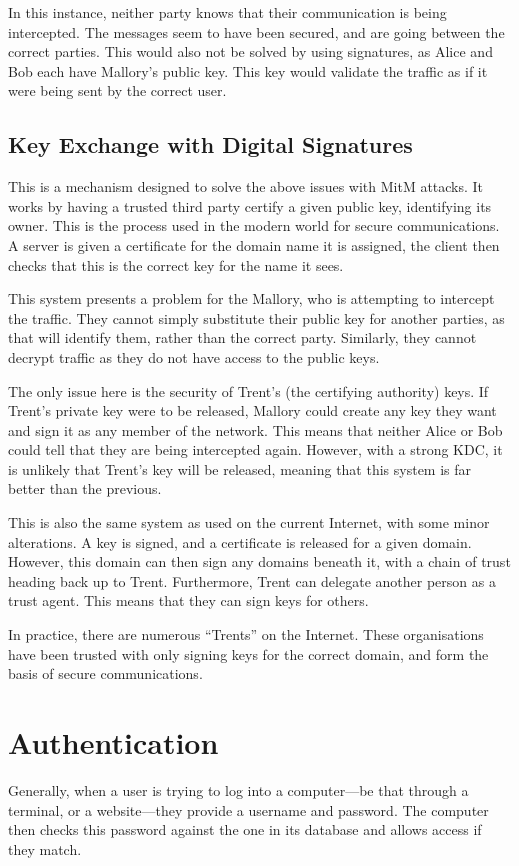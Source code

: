			In this instance, neither party knows that their communication is being intercepted.
			The messages seem to have been secured, and are going between the correct parties.
			This would also not be solved by using signatures, as Alice and Bob each have Mallory's public key.
			This key would validate the traffic as if it were being sent by the correct user.

		\subsection{Key Exchange with Digital Signatures}
			This is a mechanism designed to solve the above issues with MitM attacks.
			It works by having a trusted third party certify a given public key, identifying its owner.
			This is the process used in the modern world for secure communications.
			A server is given a certificate for the domain name it is assigned, the client then checks that this is the correct key for the name it sees.

			This system presents a problem for the Mallory, who is attempting to intercept the traffic.
			They cannot simply substitute their public key for another parties, as that will identify them, rather than the correct party.
			Similarly, they cannot decrypt traffic as they do not have access to the public keys.

			The only issue here is the security of Trent's (the certifying authority) keys.
			If Trent's private key were to be released, Mallory could create any key they want and sign it as any member of the network.
			This means that neither Alice or Bob could tell that they are being intercepted again.
			However, with a strong KDC, it is unlikely that Trent's key will be released, meaning that this system is far better than the previous.

			This is also the same system as used on the current Internet, with some minor alterations.
			A key is signed, and a certificate is released for a given domain.
			However, this domain can then sign any domains beneath it, with a chain of trust heading back up to Trent.
			Furthermore, Trent can delegate another person as a trust agent.
			This means that they can sign keys for others.

			In practice, there are numerous ``Trents'' on the Internet.
			These organisations have been trusted with only signing keys for the correct domain,
			and form the basis of secure communications.
	\section{Authentication}
		Generally, when a user is trying to log into a computer---be that through a terminal, or a website---they provide a username and password.
		The computer then checks this password against the one in its database and allows access if they match.


